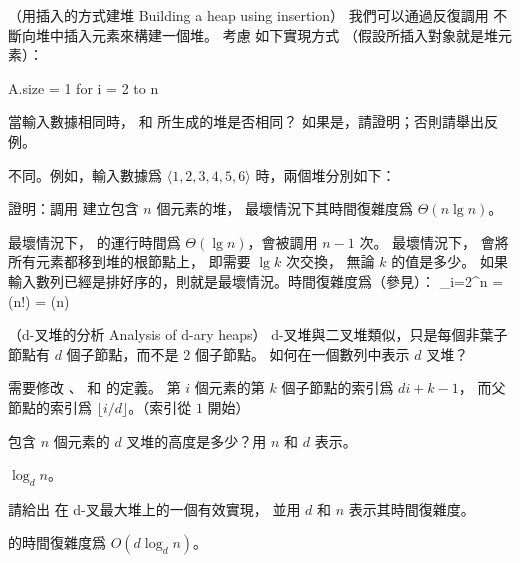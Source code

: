 \startsubject[
  title={Problems},
]

\startPROBLEM
（用插入的方式建堆 Building a heap using insertion）
我們可以通過反復調用  不斷向堆中插入元素來構建一個堆。
考慮  如下實現方式
（假設所插入對象就是堆元素）：

\startCLRSCODE
A.size = 1
for i = 2 to n
\stopCLRSCODE

\startigBase[a]
\startitem
當輸入數據相同時，  和  所生成的堆是否相同？
如果是，請證明；否則請舉出反例。
\stopitem

\startANSWER
不同。例如，輸入數據爲 $\langle 1, 2, 3, 4, 5, 6 \rangle$ 時，兩個堆分別如下：

\startcombination[2*1]
{\externalfigure[output/p6_1_a-1]}{}
{\externalfigure[output/p6_1_a-2]}{}
\stopcombination
\stopANSWER

\startitem
證明：調用  建立包含 $n$ 個元素的堆，
最壞情況下其時間復雜度爲 $\Theta(n\lg{n})$。
\stopitem

\startANSWER
最壞情況下，  的運行時間爲 $\Theta(\lg{n})$，會被調用 $n-1$ 次。
最壞情況下，  會將所有元素都移到堆的根節點上， 即需要 $\lg{k}$ 次交換，
無論 $k$ 的值是多少。
如果輸入數列已經是排好序的，則就是最壞情況。時間復雜度爲（參見\inexercise[lg_n_fac]）：
\startformula
\sum_{i=2}^{n} = \lg(n!) = \Theta(n)
\stopformula
\stopANSWER

\stopigBase
\stopPROBLEM

\startPROBLEM[problem:6-2]
（d-叉堆的分析 Analysis of d-ary heaps）
d-叉堆與二叉堆類似，只是每個非葉子節點有 $d$ 個子節點，而不是 2 個子節點。
\startigBase[a]
\startitem
如何在一個數列中表示 $d$ 叉堆？
\stopitem

\startANSWER
需要修改 、  和  的定義。
第 $i$ 個元素的第 $k$ 個子節點的索引爲 $di + k - 1$，
而父節點的索引爲 $\lfloor i/d \rfloor$。（索引從 $1$ 開始）
\stopANSWER

\startitem
包含 $n$ 個元素的 $d$ 叉堆的高度是多少？用 $n$ 和 $d$ 表示。
\stopitem

\startANSWER
$\log_d{n}$。
\stopANSWER

\startitem
請給出  在 d-叉最大堆上的一個有效實現，
並用 $d$ 和 $n$ 表示其時間復雜度。
\stopitem

\startANSWER
{} 的時間復雜度爲 $O(d\log_d{n})$。
\stopANSWER

